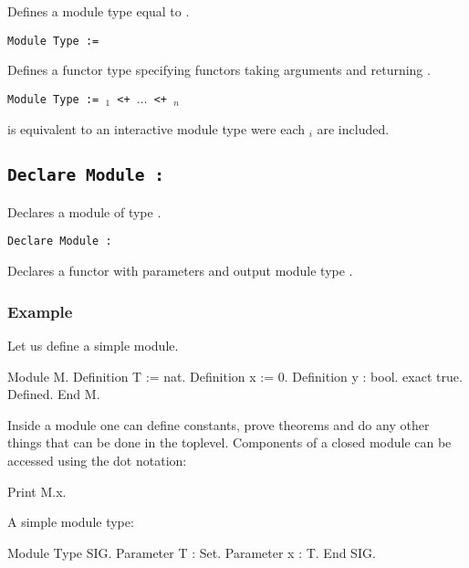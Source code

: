 Defines a module type {\ident} equal to {\modtype}.

\begin{Variants}
\item {\tt Module Type {\ident} {\modbindings} := {\modtype}}

  Defines a functor type {\ident} specifying functors taking arguments
  {\modbindings} and returning {\modtype}.

\item{\tt Module Type {\ident} {\modbindings} := {\modtype$_1$} \verb.<+. $\ldots$ \verb.<+. {\modtype$_n$}}

  is equivalent to an interactive module type were each {\modtype$_i$} are included.

\end{Variants}

\subsection{\tt Declare Module {\ident} : {\modtype}}

Declares a module {\ident} of type {\modtype}.

\begin{Variants}

\item{\tt Declare Module {\ident} {\modbindings} \verb.:. {\modtype}}

  Declares a functor with parameters {\modbindings} and output module
  type {\modtype}.


\end{Variants}


\subsubsection{Example}

Let us define a simple module.
\begin{coq_example}
Module M.
  Definition T := nat.
  Definition x := 0.
  Definition y : bool.
    exact true.
  Defined.
End M.
\end{coq_example}
Inside a module one can define constants, prove theorems and do any
other things that can be done in the toplevel. Components of a closed
module can be accessed using the dot notation:
\begin{coq_example}
Print M.x.
\end{coq_example}
A simple module type:
\begin{coq_example}
Module Type SIG.
  Parameter T : Set.
  Parameter x : T.
End SIG.
\end{coq_example}

